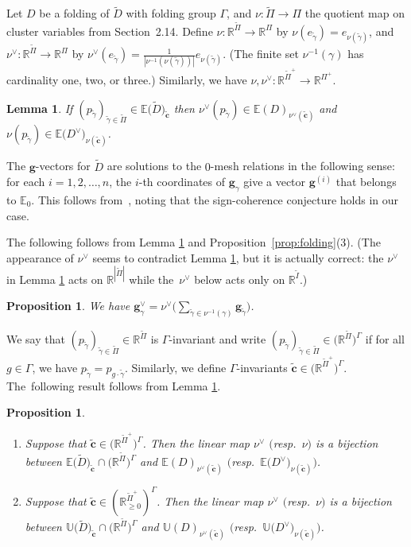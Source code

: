 \documentclass[10pt,a4paper]{amsart}
\def\R{{\mathbb R}}
\def\E{{\mathbb E}}
\def\U{{\mathbb U}}
\def\tD{{\tilde D}}
\def\tc{{\tilde \c}}
\def\tI{{\tilde I}}
\def\g{{\mathbf g}}
\def\tgamma{{\tilde \gamma}}
\def\tPi{{\tilde \Pi}}
\def\c{{\mathbf c}}
\numberwithin{equation}{section}
\newtheorem{Lemma}[Theorem]{Lemma}
\newtheorem{Proposition}[Theorem]{Proposition}
\begin{document}
Let $D$ be a folding of $\tD$ with folding group $\Gamma$, and $\nu\colon \tPi \to \Pi$ the quotient map on cluster variables from Section~2.14. Define $\nu\colon \R^{\tPi} \to \R^{\Pi}$ by $\nu(e_\tgamma) = e_{\nu(\tgamma)}$, and $\nu^\vee\colon \R^{\tPi} \to \R^{\Pi}$ by $\nu^\vee(e_\tgamma) = \frac{1}{|\nu^{-1}(\nu(\tgamma))|}e_{\nu(\tgamma)}$. (The finite set $\nu^{-1}(\gamma)$ has cardinality one, two, or three.) Similarly, we have $\nu,\nu^\vee\colon \R^{\tPi^+} \to \R^{\Pi^+}$.

\begin{Lemma}\label{lem:fold}
If $(p_{\tgamma})_{\tgamma \in \tPi} \in \E\big(\tD\big)_{\tc}$ then $\nu^\vee(p_{\tgamma}) \in \E(D)_{\nu^\vee(\tc)}$ and $\nu(p_{\tgamma}) \in \E\big(D^\vee\big)_{\nu(\tc)}$.
\end{Lemma}

The $\g$-vectors for $\tD$ are solutions to the $0$-mesh relations in the following sense: for each $i =1,2,\dots,n$, the $i$-th coordinates of $\g_\gamma$ give a vector $\g^{(i)}$ that belongs to $\E_0$. This follows from~\cite[relation~(6.13)]{CA4}, noting that the sign-coherence conjecture \cite[Conjecture~6.13]{CA4} holds in our case.

The following follows from Lemma \ref{lem:fold} and Proposition~\ref{prop:folding}(3). (The appearance of $\nu^\vee$ seems to contradict Lemma \ref{lem:fold}, but it is actually correct: the $\nu^\vee$ in Lemma \ref{lem:fold} acts on $\R^{|\tPi|}$ while the~$\nu^\vee$ below acts only on $\R^{\tI}$.)
\begin{Proposition}\label{prop:gvee}
We have $\g^\vee_\gamma = \nu^\vee\Big( \sum_{\tgamma \in \nu^{-1}(\gamma)}\g_\tgamma\Big)$.
\end{Proposition}

We say that $(p_{\tgamma})_{\tgamma \in \tPi} \in \R^{\tPi}$ is $\Gamma$-invariant and write $(p_{\tgamma})_{\tgamma \in \tPi} \in \big(\R^{\tPi}\big)^\Gamma$ if for all $g \in \Gamma$, we have $p_{\tgamma} = p_{g \cdot \tgamma}$. Similarly, we define $\Gamma$-invariants $\tc \in \big(\R^{\tPi^+}\big)^\Gamma$. The~following result follows from Lemma \ref{lem:fold}.

\begin{Proposition}\label{prop:bijfold} \
\begin{enumerate}\itemsep=0pt
\item[$1.$]
Suppose that $\tc \in \big(\R^{\tPi^+}\big)^\Gamma$.
Then the linear map $\nu^\vee$ $($resp.\ $\nu)$ is a bijection between $\E\big(\tD\big)_{\tc} \cap \big(\R^{\tPi}\big)^\Gamma$ and $\E(D)_{\nu^\vee(\tc)}$ $\big($resp.\ $\E\big(D^\vee\big)_{\nu(\tc)}\big)$.
\item[$2.$]
Suppose that $\tc \in (\R_{\geq 0}^{\tPi^+})^\Gamma$.
Then the linear map $\nu^\vee$ $($resp.\ $\nu)$ is a bijection between $\U\big(\tD\big)_{\tc} \cap \big(\R^{\tPi}\big)^\Gamma$ and $\U(D)_{\nu^\vee(\tc)}$ $\big($resp.\ $\U\big(D^\vee\big)_{\nu(\tc)}\big)$.
\end{enumerate}
\end{Proposition}
\end{document}
